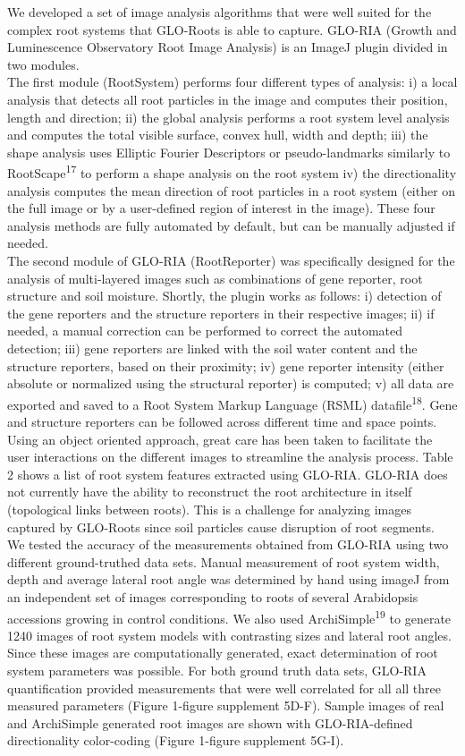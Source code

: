 \documentclass[]{article}
\begin{document}
We developed a set of image analysis algorithms that were well suited
for the complex root systems that GLO-Roots is able to capture. GLO-RIA
(Growth and Luminescence Observatory Root Image Analysis) is an ImageJ
plugin divided in two modules.\\The first module (RootSystem) performs
four different types of analysis: i) a local analysis that detects all
root particles in the image and computes their position, length and
direction; ii) the global analysis performs a root system level analysis
and computes the total visible surface, convex hull, width and depth;
iii) the shape analysis uses Elliptic Fourier Descriptors or
pseudo-landmarks similarly to RootScape\textsuperscript{17} to perform a
shape analysis on the root system iv) the directionality analysis
computes the mean direction of root particles in a root system (either
on the full image or by a user-defined region of interest in the image).
These four analysis methods are fully automated by default, but can be
manually adjusted if needed.\\The second module of GLO-RIA
(RootReporter) was specifically designed for the analysis of
multi-layered images such as combinations of gene reporter, root
structure and soil moisture. Shortly, the plugin works as follows: i)
detection of the gene reporters and the structure reporters in their
respective images; ii) if needed, a manual correction can be performed
to correct the automated detection; iii) gene reporters are linked with
the soil water content and the structure reporters, based on their
proximity; iv) gene reporter intensity (either absolute or normalized
using the structural reporter) is computed; v) all data are exported and
saved to a Root System Markup Language (RSML)
datafile\textsuperscript{18}. Gene and structure reporters can be
followed across different time and space points. Using an object
oriented approach, great care has been taken to facilitate the user
interactions on the different images to streamline the analysis process.
Table 2 shows a list of root system features extracted using GLO-RIA.
GLO-RIA does not currently have the ability to reconstruct the root
architecture in itself (topological links between roots). This is a
challenge for analyzing images captured by GLO-Roots since soil
particles cause disruption of root segments.\\We tested the accuracy of
the measurements obtained from GLO-RIA using two different
ground-truthed data sets. Manual measurement of root system width, depth
and average lateral root angle was determined by hand using imageJ from
an independent set of images corresponding to roots of several
Arabidopsis accessions growing in control conditions. We also used
ArchiSimple\textsuperscript{19} to generate 1240 images of root system
models with contrasting sizes and lateral root angles. Since these
images are computationally generated, exact determination of root system
parameters was possible. For both ground truth data sets, GLO-RIA
quantification provided measurements that were well correlated for all
all three measured parameters (Figure 1-figure supplement 5D-F). Sample
images of real and ArchiSimple generated root images are shown with
GLO-RIA-defined directionality color-coding (Figure 1-figure supplement
5G-I).
\end{document}
